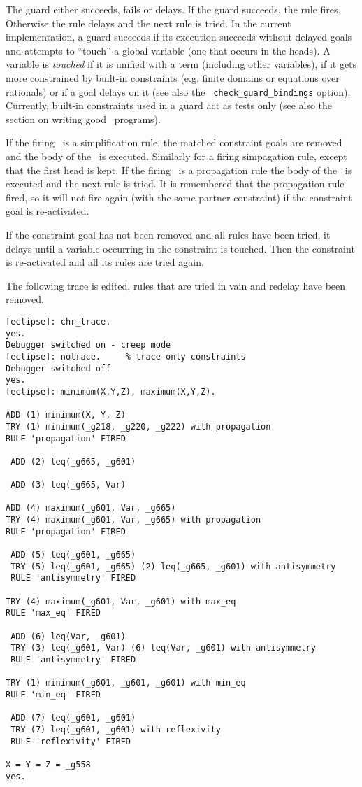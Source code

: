 The guard either succeeds, fails or delays.  If the guard succeeds,
the rule fires. Otherwise the rule delays and the next rule is tried.
In the current implementation, a guard succeeds if its execution
succeeds without delayed goals and attempts to ``touch'' a global
variable (one that occurs in the heads).  A variable is {\em touched}
if it is unified with a term (including other variables), if it gets
more constrained by built-in constraints (e.g. finite domains or
equations over rationals) or if a goal delays on it (see also the {\tt
check\_guard\_bindings} option).  Currently, built-in constraints used
in a guard act as tests only (see also the section on writing good
\chr\ programs).

If the firing \chr\ is a simplification rule, the matched constraint
goals are removed and the body of the \chr\ is executed.  Similarly
for a firing simpagation rule, except that the first head is kept.  If
the firing \chr\ is a propagation rule the
body of the \chr\ is executed and the next rule is tried. It is remembered
that the propagation rule fired, so it will not fire again (with the
same partner constraint) if the constraint goal is re-activated.

If the constraint goal has not been removed and all rules have been tried,
it delays until a variable occurring in the constraint is touched.
Then the constraint is re-activated and all its rules are tried
again.

The following trace is edited, 
rules that are tried in vain and redelay have been removed. 
\begin{verbatim}
[eclipse]: chr_trace.
yes.
Debugger switched on - creep mode
[eclipse]: notrace.     % trace only constraints
Debugger switched off
yes.
[eclipse]: minimum(X,Y,Z), maximum(X,Y,Z).

ADD (1) minimum(X, Y, Z)
TRY (1) minimum(_g218, _g220, _g222) with propagation
RULE 'propagation' FIRED

 ADD (2) leq(_g665, _g601)

 ADD (3) leq(_g665, Var)

ADD (4) maximum(_g601, Var, _g665)
TRY (4) maximum(_g601, Var, _g665) with propagation
RULE 'propagation' FIRED

 ADD (5) leq(_g601, _g665)
 TRY (5) leq(_g601, _g665) (2) leq(_g665, _g601) with antisymmetry
 RULE 'antisymmetry' FIRED

TRY (4) maximum(_g601, Var, _g601) with max_eq
RULE 'max_eq' FIRED

 ADD (6) leq(Var, _g601)
 TRY (3) leq(_g601, Var) (6) leq(Var, _g601) with antisymmetry
 RULE 'antisymmetry' FIRED

TRY (1) minimum(_g601, _g601, _g601) with min_eq
RULE 'min_eq' FIRED

 ADD (7) leq(_g601, _g601)
 TRY (7) leq(_g601, _g601) with reflexivity
 RULE 'reflexivity' FIRED

X = Y = Z = _g558
yes.
\end{verbatim}




